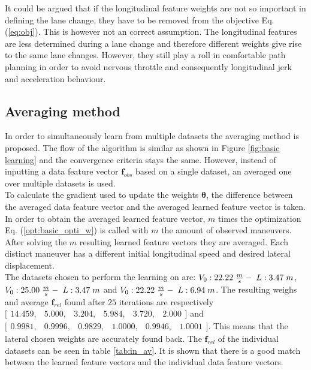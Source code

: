 It could be argued that if the longitudinal feature weights are not so important in defining the lane change, they have to be removed from the objective Eq. (\ref{eq:obj}). This is however not an correct assumption. The longitudinal features are less determined during a lane change and therefore different weights give rise to the same lane changes. However, they still play a roll in comfortable path planning in order to avoid nervous throttle and consequently longitudinal jerk and acceleration behaviour. 


\subsection{Averaging method}\label{s:averaging_method}
In order to simultaneously learn from multiple datasets the averaging method is proposed. \cite{Kuderer2015a} The flow of the algorithm is similar as shown in Figure \ref{fig:basic learning} and the convergence criteria stays the same. However, instead of inputting a data feature vector $\bm{f}_{obs}$ based on a single dataset, an averaged one over multiple datasets is used.\\
To calculate the gradient used to update the weights $\bm{\theta}$, the difference between the averaged data feature vector and the averaged learned feature vector is taken. In order to obtain the averaged learned feature vector, $m$ times the optimization Eq. (\ref{opt:basic_opti_w}) is called with $m$ the amount of observed maneuvers. After solving the $m$ resulting learned feature vectors they are averaged. Each distinct maneuver has a different initial longitudinal speed and desired lateral displacement.\\
 

The datasets chosen to perform the learning on are: $V_0:22.22\hspace{1mm}\frac{m}{s}-\hspace{1mm} L:3.47\hspace{1mm}m$, $V_0:25.00\hspace{1mm}\frac{m}{s}-\hspace{1mm} L:3.47\hspace{1mm}m$ and $V_0:22.22\hspace{1mm}\frac{m}{s}-\hspace{1mm} L:6.94\hspace{1mm}m$. The resulting weighs and average $\bm{f}_{rel}$ found after $25$ iterations are respectively $\bigl[ \begin{smallmatrix} 14.459,&5.000,&3.204,&5.984,&3.720,&2.000\end{smallmatrix}\bigr]$ and $\bigl[ \begin{smallmatrix} 0.9981,&0.9996,&0.9829,&1.0000,&0.9946,&1.0001\end{smallmatrix}\bigr]$. This means that the lateral chosen weights are accurately found back. The $\bm{f}_{rel}$ of the individual datasets can be seen in table \ref{tab:in_av}. It is shown that there is a good match between the learned feature vectors and the individual data feature vectors.
 
